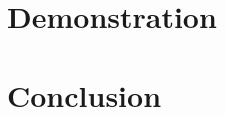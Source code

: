 \documentclass[a4paper]{article}
\begin{document}
\section{Demonstration}

\section{Conclusion}
\end{document}
